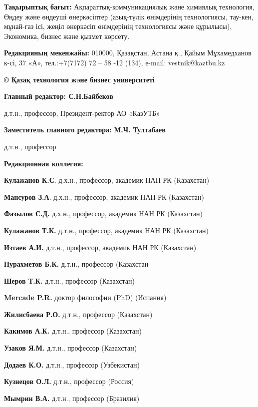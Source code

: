 \textbf{Тақырыптық бағыт:} Ақпараттық-коммуникациялық және химиялық
технология, Өңдеу және өңдеуші өнеркәсіптер (азық-түлік өнімдерінің
технологиясы, тау-кен, мұнай-газ ісі, жеңіл өнеркәсіп өнімдерінің
технологиясы және құрылысы), Экономика, бизнес және қызмет көрсету.

\textbf{Редакцияның мекенжайы:} 010000, Қазақстан, Астана қ., Қайым
Мұхамедханов к-сі, 37 «А», тел.:+7(7172) 72 -- 58 -12 (134), е-mail:
vestnik@kaztbu.kz

\begin{center}
\textbf{\large © Қазақ технология жəне бизнес университеті}
\end{center}

\pagebreak

\begin{center}
\textbf{Главный редактор: С.Н.Байбеков}

д.т.н., профессор, Президент-ректор АО «КазУТБ»

\textbf{Заместитель главного редактора: М.Ч. Тултабаев}

д.т.н., профессор

\textbf{Редакционная коллегия:}
\end{center}

\textbf{Кулажанов К.С}. д.х.н., профессор, академик НАН РК (Казахстан)

\textbf{Мансуров З.А}. д.х.н., профессор, академик НАН РК (Казахстан)

\textbf{Фазылов С.Д.} д.х.н., профессор, академик НАН РК (Казахстан)

\textbf{Кулажанов Т.К.} д.т.н., профессор, академик НАН РК (Казахстан)

\textbf{Изтаев А.И.} д.т.н., профессор, академик НАН РК (Казахстан)

\textbf{Нурахметов Б.К.} д.т.н., профессор (Казахстан

\textbf{Шеров Т.К.} д.т.н., профессор (Казахстан)

\textbf{Mercade P.R.} доктор философии (PhD) (Испания)

\textbf{Жилисбаева Р.О.} д.т.н., профессор (Казахстан)

\textbf{Какимов А.К.} д.т.н., профессор (Казахстан)

\textbf{Узаков Я.М.} д.т.н., профессор (Казахстан)

\textbf{Додаев К.О.} д.т.н., профессор (Узбекистан)

\textbf{Кузнецов О.Л.} д.т.н., профессор (Россия)

\textbf{Мымрин В.А.} д.т.н., профессор (Бразилия)

